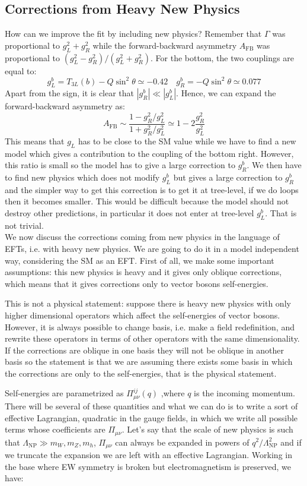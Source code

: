 \documentclass[../main.tex]{subfiles}
\begin{document}
\subsection{Corrections from Heavy New Physics}
How can we improve the fit by including new physics? Remember that $\Gamma$ was proportional to $g_L^2+g_R^2$ while the forward-backward asymmetry $A_{\text{FB}}$ was proportional to $(g_L^2-g_R^2)/(g_L^2+g_R^2)$. For the bottom, the two couplings are equal to:
\[
g_L^b=T_{3L}(b)-Q\sin^2\theta\simeq-0.42 \quad g_R^b=-Q\sin^2\theta\simeq0.077
\]
Apart from the sign, it is clear that $|g_R^b|\ll|g_L^b|$. Hence, we can expand the forward-backward asymmetry as:
\[
A_{\text{FB}}\sim\frac{1-g_R^2/g_L^2}{1+g_R^2/g_L^2}\simeq1-2\frac{g_R^2}{g_L^2}
\]
This means that $g_L$ has to be close to the SM value while we have to find a new model which gives a contribution to the coupling of the bottom right. However, this ratio is small so the model has to give a large correction to $g_R^b$. We then have to find new physics which does not modify $g_L^b$ but gives a large correction to $g_R^b$ and the simpler way to get this correction is to get it at tree-level, if we do loops then it becomes smaller. This would be difficult because the model should not destroy other predictions, in particular it does not enter at tree-level $g_L^b$. That is not trivial.\\
We now discuss the corrections coming from new physics in the language of EFTs, i.e. with heavy new physics. We are going to do it in a model independent way, considering the SM as an EFT. First of all, we make some important assumptions: this new physics is heavy and it gives only oblique corrections, which means that it gives corrections only to vector bosons self-energies.
\begin{kaobox}[frametitle=Remark]
This is not a physical statement: suppose there is heavy new physics with only higher dimensional operators which affect the self-energies of vector bosons. However, it is always possible to change basis, i.e. make a field redefinition, and rewrite these operators in terms of other operators with the same dimensionality. If the corrections are oblique in one basis they will not be oblique in another basis so the statement is that we are assuming there exists some basis in which the corrections are only to the self-energies, that is the physical statement.
\end{kaobox}
Self-energies are parametrized as $\Pi_{\mu\nu}^{ij}(q)$ ,where $q$ is the incoming momentum. There will be several of these quantities and what we can do is to write a sort of effective Lagrangian, quadratic in the gauge fields, in which we write all possible terms whose coefficients are $\Pi_{\mu\nu}$. Let's say that the scale of new physics is such that $\Lambda_{\text{NP}}\gg m_W, m_Z, m_h$, $\Pi_{\mu\nu}$ can always be expanded in powers of $q^2/\Lambda_{\text{NP}}^2$ and if we truncate the expansion we are left with an effective Lagrangian. Working in the base where EW symmetry is broken but electromagnetism is preserved, we have:
\end{document}
